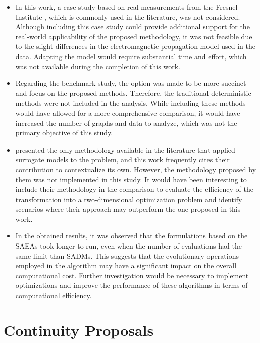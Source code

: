 		\begin{itemize}
			\item In this work, a case study based on real measurements from the Fresnel Institute \citep{geffrin2005free}, which is commonly used in the literature, was not considered. Although including this case study could provide additional support for the real-world applicability of the proposed methodology, it was not feasible due to the slight differences in the electromagnetic propagation model used in the data. Adapting the model would require substantial time and effort, which was not available during the completion of this work.
			\item Regarding the benchmark study, the option was made to be more succinct and focus on the proposed methods. Therefore, the traditional deterministic methods were not included in the analysis. While including these methods would have allowed for a more comprehensive comparison, it would have increased the number of graphs and data to analyze, which was not the primary objective of this study.
			\item \cite{salucci2022learned} presented the only methodology available in the literature that applied surrogate models to the problem, and this work frequently cites their contribution to contextualize its own. However, the methodology proposed by them was not implemented in this study. It would have been interesting to include their methodology in the comparison to evaluate the efficiency of the transformation into a two-dimensional optimization problem and identify scenarios where their approach may outperform the one proposed in this work.
			\item In the obtained results, it was observed that the formulations based on the SAEAs took longer to run, even when the number of evaluations had the same limit than SADMs. This suggests that the evolutionary operations employed in the algorithm may have a significant impact on the overall computational cost. Further investigation would be necessary to implement optimizations and improve the performance of these algorithms in terms of computational efficiency.
		\end{itemize}
		
	\section{Continuity Proposals}\label{chap:final:future}
		
		

